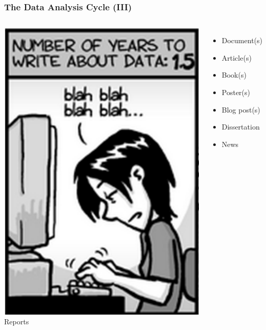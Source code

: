 \documentclass{beamer}
\begin{document}
\begin{frame}
\frametitle{The Data Analysis Cycle (III)}
\begin{columns}
    \hspace*{1cm}
    \includegraphics[scale=0.4]{./figures/im3.png}
    Reports  
    \begin{itemize}
    \item[] Document(s)
    \item[] Article(s)
    \item[] Book(s)
    \item[] Poster(s)
    \item[] Blog post(s)
    \item[] Dissertation
    \item[] News
    \end{itemize}
\end{columns}
\end{frame}
\end{document}
